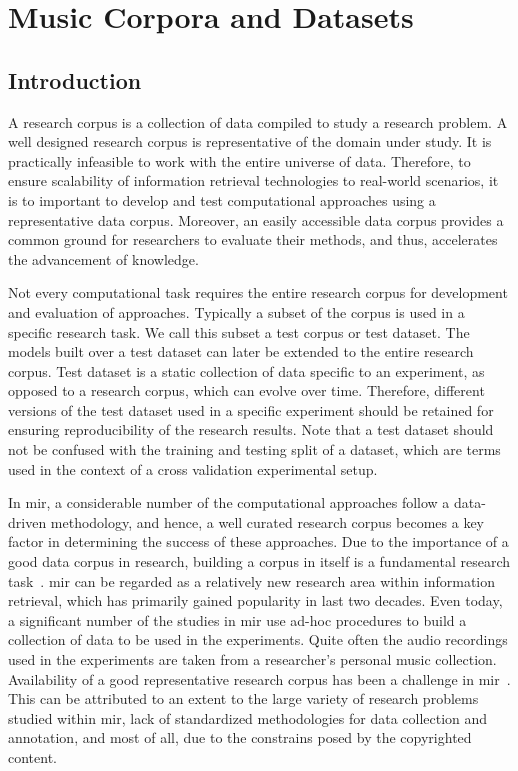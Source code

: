 
\chapter{Music Corpora and Datasets}
\label{chap:corpus_music_corpora_and_datasets}

\section{Introduction}
\label{sec:corpus_intro}

A research corpus is a collection of data compiled to study a research problem. A well designed research corpus is representative of the domain under study. It is practically infeasible to work with the entire universe of data. Therefore, to ensure scalability of information retrieval technologies to real-world scenarios, it is to important to develop and test computational approaches using a representative data corpus. Moreover, an easily accessible data corpus provides a common ground for researchers to evaluate their methods, and thus, accelerates the advancement of knowledge. 

Not every computational task requires the entire research corpus for development and evaluation of approaches. Typically a subset of the corpus is used in a specific research task. We call this subset a test corpus or test dataset. The models built over a test dataset can later be extended to the entire research corpus. Test dataset is a static collection of data specific to an experiment, as opposed to a research corpus, which can evolve over time. Therefore, different versions of the test dataset used in a specific experiment should be retained for ensuring reproducibility of the research results. Note that a test dataset should not be confused with the training and testing split of a dataset, which are terms used in the context of a cross validation experimental setup.

In \gls{mir}, a considerable number of the computational approaches follow a data-driven methodology, and hence, a well curated research corpus becomes a key factor in determining the success of these approaches. Due to the importance of a good data corpus in research, building a corpus in itself is a fundamental research task~\citep{macmullen2003requirements}. \Gls{mir} can be regarded as a relatively new research area within information retrieval, which has primarily gained popularity in last two decades. Even today, a significant number of the studies in \gls{mir} use ad-hoc procedures to build a collection of data to be used in the experiments. Quite often the audio recordings used in the experiments are taken from a researcher's personal music collection. Availability of a good representative research corpus has been a challenge in \gls{mir}~\citep{serra:14:corpus}. This can be attributed to an extent to the large variety of research problems studied within \gls{mir}, lack of standardized methodologies for data collection and annotation, and most of all, due to the constrains posed by the copyrighted content.

